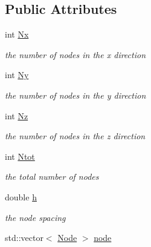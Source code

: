 \subsection*{Public Attributes}
\begin{DoxyCompactItemize}
\item 
\hypertarget{class_grid_a5096f486b265399bd0b8f111d015f51a}{}int \hyperlink{class_grid_a5096f486b265399bd0b8f111d015f51a}{Nx}\label{class_grid_a5096f486b265399bd0b8f111d015f51a}

\begin{DoxyCompactList}\small\item\em the number of nodes in the x direction \end{DoxyCompactList}\item 
\hypertarget{class_grid_a99ce71c381de38a654c3395855a3ae5d}{}int \hyperlink{class_grid_a99ce71c381de38a654c3395855a3ae5d}{Ny}\label{class_grid_a99ce71c381de38a654c3395855a3ae5d}

\begin{DoxyCompactList}\small\item\em the number of nodes in the y direction \end{DoxyCompactList}\item 
\hypertarget{class_grid_ade0609b6070bad52fbb2a7c16c927246}{}int \hyperlink{class_grid_ade0609b6070bad52fbb2a7c16c927246}{Nz}\label{class_grid_ade0609b6070bad52fbb2a7c16c927246}

\begin{DoxyCompactList}\small\item\em the number of nodes in the z direction \end{DoxyCompactList}\item 
\hypertarget{class_grid_a6d59374f53543d1fbc59f42014b769aa}{}int \hyperlink{class_grid_a6d59374f53543d1fbc59f42014b769aa}{Ntot}\label{class_grid_a6d59374f53543d1fbc59f42014b769aa}

\begin{DoxyCompactList}\small\item\em the total number of nodes \end{DoxyCompactList}\item 
\hypertarget{class_grid_a41842316ab09c4808e1e22a1af763975}{}double \hyperlink{class_grid_a41842316ab09c4808e1e22a1af763975}{h}\label{class_grid_a41842316ab09c4808e1e22a1af763975}

\begin{DoxyCompactList}\small\item\em the node spacing \end{DoxyCompactList}\item 
\hypertarget{class_grid_ae7441f76ba57ccafa703e00f6d052d4b}{}std\+::vector$<$ \hyperlink{class_node}{Node} $>$ \hyperlink{class_grid_ae7441f76ba57ccafa703e00f6d052d4b}{node}\label{class_grid_ae7441f76ba57ccafa703e00f6d052d4b}


\end{DoxyCompactItemize}
